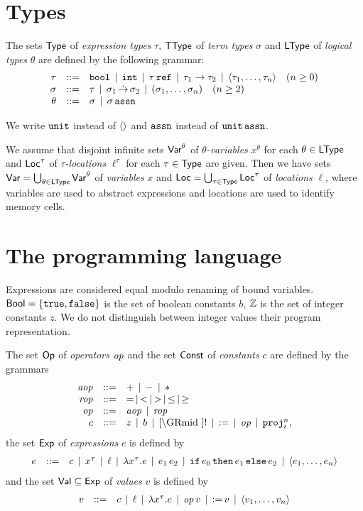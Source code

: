 \documentclass[12pt,a4paper]{article}
\newcommand{\aop}{\nstyle{aop}}
\newcommand{\rop}{\nstyle{rop}}
\begin{document}
\section{Types}

\begin{definition}
  The sets $\mathsf{Type}$ of {\em expression types} $\tau$, $\mathsf{TType}$ of {\em term types} $\sigma$ and
  $\mathsf{LType}$ of {\em logical types} $\theta$ are defined by the following grammar:
  \[\GRbeg
  \tau \GRis \tbool \GRmid \tint \GRmid \tref{\tau}
  \GRmid \tarrow{\tau_1}{\tau_2} \GRmid \tuple{\tau_1,\ldots,\tau_n} \quad (n \ge 0)
  \\
  \sigma \GRis \tau \GRmid \ttarrow{\sigma_1}{\sigma_2} \GRmid \ttuple{\sigma_1,\ldots,\sigma_n} \quad (n \ge 2)
  \\
  \theta \GRis \sigma \GRmid \tassn[\sigma]
  \GRend\]
\end{definition}

We write $\mathtt{unit}$ instead of $\langle  \rangle$ and $\tassn$ instead of $\tassn[\tunit]$.

We assume that disjoint infinite sets $\mathsf{Var}^\theta$ of {\em $\theta$-variables} $x^\theta$ for each
$\theta\in\mathsf{LType}$ and $\mathsf{Loc}^\tau$ of {\em $\tau$-locations} $\ell^\tau$ for each $\tau\in\mathsf{Type}$ are given.
Then we have sets $\mathsf{Var} = \bigcup_{\theta\in\mathsf{LType}}\mathsf{Var}^\theta$ of
{\em variables} $x$ and $\mathsf{Loc} = \bigcup_{\tau\in\mathsf{Type}}\mathsf{Loc}^\tau$ of {\em locations} $\ell$, where variables are
used to abstract expressions and locations are used to identify memory cells.


\section{The programming language}

Expressions are considered equal modulo renaming of bound variables. $\mathsf{Bool}=\{\mathtt{true},\mathtt{false}\}$ is
the set of boolean constants $b$, $\mathbb Z$ is the set of integer constants $z$. We do not distinguish
between integer values their program representation.

\begin{definition}[Expressions]
  The set $\mathsf{Op}$ of {\em operators} $\mathit{op}$ and the set $\mathsf{Const}$ of {\em constants} $c$ are defined by
  the grammars
  \[\GRbeg
  \aop \GRis + \GRmid - \GRmid * \\
  \rop \GRis = \GRmid < \GRmid > \GRmid \le \GRmid \ge \\
  \op \GRis \aop \GRmid \rop \\
  c \GRis z \GRmid b \GRmid \cref \GRmid ! \GRmid \assign
  \GRmid \op
  \GRmid \proj{n}{i},
  \GRend\]
  the set $\mathsf{Exp}$ of {\em expressions} $e$ is defined by
  \[\begin{array}{rrlll}
  e & ::= & c \,\mid\, x^\tau \,\mid\, \ell \,\mid\, \lambda x^\tau.e \,\mid\, e_1\,e_2
  \,\mid\, \mathtt{if}\,e_0\,\mathtt{then}\,e_1\,\mathtt{else}\,e_2 \,\mid\, \langle e_1,\ldots,e_n \rangle
  \end{array}\]
  and the set $\mathsf{Val} \subseteq \mathsf{Exp}$ of {\em values} $v$ is defined by
  \[\begin{array}{rrlll}
  v & ::= & c \,\mid\, \ell \,\mid\, \lambda x^\tau.e \,\mid\, \mathit{op}\,v \,\mid\, \mathtt{:=}\,v \,\mid\, \langle v_1,\ldots,v_n \rangle
  \end{array}\]
\end{definition}
\end{document}

